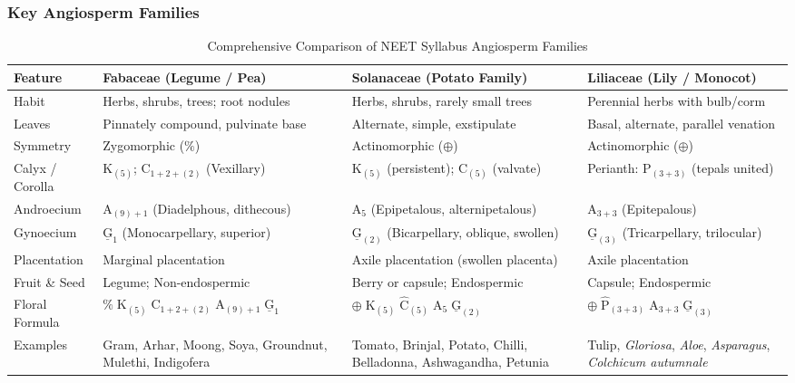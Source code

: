\documentclass[11pt,a4paper]{article}
\begin{document}
\subsubsection{Key Angiosperm Families}
\begin{table}[h]
\centering
\small
\begin{tabularx}{\textwidth}{l X X X}
\toprule
\textbf{Feature} & \textbf{Fabaceae (Legume / Pea)} & \textbf{Solanaceae (Potato Family)} & \textbf{Liliaceae (Lily / Monocot)} \\
\midrule
Habit & Herbs, shrubs, trees; root nodules & Herbs, shrubs, rarely small trees & Perennial herbs with bulb/corm \\
Leaves & Pinnately compound, pulvinate base & Alternate, simple, exstipulate & Basal, alternate, parallel venation \\
Symmetry & Zygomorphic ($\%$) & Actinomorphic ($\oplus$) & Actinomorphic ($\oplus$) \\
Calyx / Corolla & $\text{K}_{(5)}$; $\text{C}_{1+2+(2)}$ (Vexillary) & $\text{K}_{(5)}$ (persistent); $\text{C}_{(5)}$ (valvate) & Perianth: $\text{P}_{(3+3)}$ (tepals united) \\
Androecium & $\text{A}_{(9)+1}$ (Diadelphous, dithecous) & $\text{A}_5$ (Epipetalous, alternipetalous) & $\text{A}_{3+3}$ (Epitepalous) \\
Gynoecium & $\underline{\text{G}}_1$ (Monocarpellary, superior) & $\underline{\text{G}}_{(2)}$ (Bicarpellary, oblique, swollen) & $\underline{\text{G}}_{(3)}$ (Tricarpellary, trilocular) \\
Placentation & Marginal placentation & Axile placentation (swollen placenta) & Axile placentation \\
Fruit \& Seed & Legume; Non-endospermic & Berry or capsule; Endospermic & Capsule; Endospermic \\
Floral Formula & $\% \;\text{K}_{(5)} \;\text{C}_{1+2+(2)} \;\text{A}_{(9)+1} \;\underline{\text{G}}_1$ & $\oplus \;\text{K}_{(5)} \;\widehat{\text{C}}_{(5)} \;\text{A}_5 \;\underline{\text{G}}_{(2)}$ & $\oplus \;\widehat{\text{P}}_{(3+3)} \;\text{A}_{3+3} \;\underline{\text{G}}_{(3)}$ \\
Examples & Gram, Arhar, Moong, Soya, Groundnut, Mulethi, Indigofera & Tomato, Brinjal, Potato, Chilli, Belladonna, Ashwagandha, Petunia & Tulip, \textit{Gloriosa}, \textit{Aloe}, \textit{Asparagus}, \textit{Colchicum autumnale} \\
\bottomrule
\end{tabularx}
\caption{Comprehensive Comparison of NEET Syllabus Angiosperm Families}
\end{table}
\end{document}
